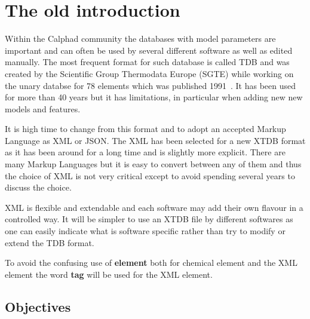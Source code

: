 \documentclass{article}
\begin{document}
\begin{appendices}
\begin{enumerate}
\end{enumerate}

\newpage

\setcounter{equation}{0}
\renewcommand{\theequation}{F\arabic{equation}}
\setcounter{figure}{0}
\renewcommand{\thefigure}{F\arabic{figure}}

\section{The old introduction}\label{sec:oldintro}

Within the Calphad community the databases with model parameters are
important and can often be used by several different software as well
as edited manually.  The most frequent format for such database is
called TDB and was created by the Scientific Group Thermodata Europe
(SGTE) while working on the unary databse for 78 elements which was
published 1991~\cite{91Din}.  It has been used for more than 40 years
but it has limitations, in particular when adding new new models and
features.

It is high time to change from this format and to adopt an accepted
Markup Language as XML or JSON.  The XML has been selected for a new
XTDB format as it has been around for a long time and is slightly more
explicit.  There are many Markup Languages but it is easy to convert
between any of them and thus the choice of XML is not very critical
except to avoid spending several years to discuss the choice.

XML is flexible and extendable and each software may add their own
flavour in a controlled way.  It will be simpler to use an XTDB file
by different softwares as one can easily indicate what is software
specific rather than try to modify or extend the TDB format.

To avoid the confusing use of {\bf element} both for chemical element
and the XML element the word {\bf tag} will be used for the XML
element.

\subsection{Objectives}


\end{appendices}
\end{document}
